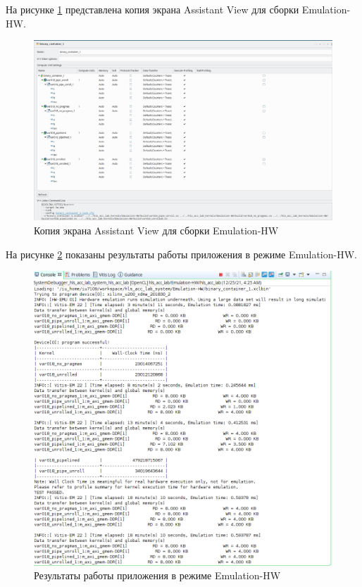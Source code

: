 На рисунке \ref{img:assistant} представлена копия экрана Assistant View для сборки Emulation-HW.

\begin{figure}[H]
	\begin{center}
		\includegraphics[scale=0.2]{img/assistant.png}
	\end{center}
	\captionsetup{justification=centering}
	\caption{Копия экрана Assistant View для сборки Emulation-HW}
	\label{img:assistant}
\end{figure}

На рисунке \ref{img:hw} показаны результаты работы приложения в режиме Emulation-HW.

\begin{figure}[H]
	\begin{center}
		\includegraphics[scale=0.5]{img/hw.png}
	\end{center}
	\captionsetup{justification=centering}
	\caption{Результаты работы приложения в режиме Emulation-HW}
	\label{img:hw}
\end{figure}

